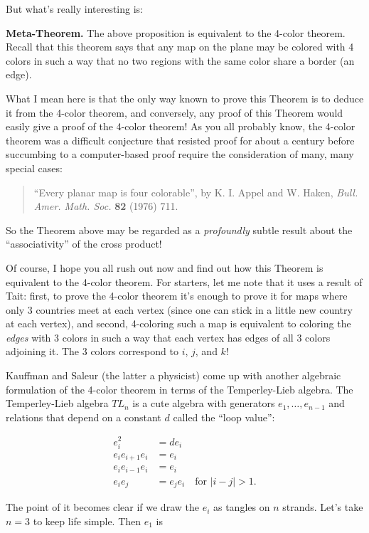 \documentclass{article}
\begin{document}
But what's really interesting is:

\textbf{Meta-Theorem.} The above proposition is equivalent to the
4-color theorem. Recall that this theorem says that any map on the plane
may be colored with 4 colors in such a way that no two regions with the
same color share a border (an edge).

What I mean here is that the only way known to prove this Theorem is to
deduce it from the 4-color theorem, and conversely, any proof of this
Theorem would easily give a proof of the 4-color theorem! As you all
probably know, the 4-color theorem was a difficult conjecture that
resisted proof for about a century before succumbing to a computer-based
proof require the consideration of many, many special cases:

\begin{quote}
``Every planar map is four colorable'', by K. I. Appel and W. Haken,
\emph{Bull. Amer. Math. Soc.} \textbf{82} (1976) 711.
\end{quote}

So the Theorem above may be regarded as a \emph{profoundly} subtle
result about the ``associativity'' of the cross product!

Of course, I hope you all rush out now and find out how this Theorem is
equivalent to the 4-color theorem. For starters, let me note that it
uses a result of Tait: first, to prove the 4-color theorem it's enough
to prove it for maps where only 3 countries meet at each vertex (since
one can stick in a little new country at each vertex), and second,
4-coloring such a map is equivalent to coloring the \emph{edges} with 3
colors in such a way that each vertex has edges of all 3 colors
adjoining it. The 3 colors correspond to \(i\), \(j\), and \(k\)!

Kauffman and Saleur (the latter a physicist) come up with another
algebraic formulation of the 4-color theorem in terms of the
Temperley-Lieb algebra. The Temperley-Lieb algebra \(TL_n\) is a cute
algebra with generators \(e_1, \ldots, e_{n-1}\) and relations that
depend on a constant \(d\) called the ``loop value'':

\[\begin{aligned}e_i^2 &= de_i \\ e_i e_{i+1} e_i &= e_i \\ e_i e_{i-1} e_i &= e_i \\ e_i e_j &= e_j e_i \quad\text{for } |i-j| > 1.\end{aligned}\]

The point of it becomes clear if we draw the \(e_i\) as tangles on \(n\)
strands. Let's take \(n = 3\) to keep life simple. Then \(e_1\) is
\end{document}
